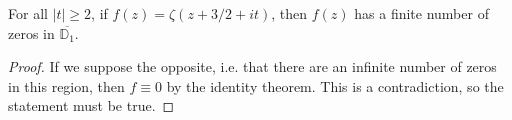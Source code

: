 \begin{theorem}[ZetaShiftFiniteZeros]
\label{ZetaShiftFiniteZeros}
\leanok
For all $|t|\geq 2$, if $f(z)=\zeta(z+3/2+it)$, then $f(z)$ has a finite number of zeros in
    $\overline{\mathbb{D}_1}$.
\end{theorem}
\begin{proof}
\leanok
If we suppose the opposite, i.e. that there are an infinite number of zeros in this region, then
    $f\equiv 0$ by the identity theorem. This is a contradiction, so the statement must be true.
\end{proof}
